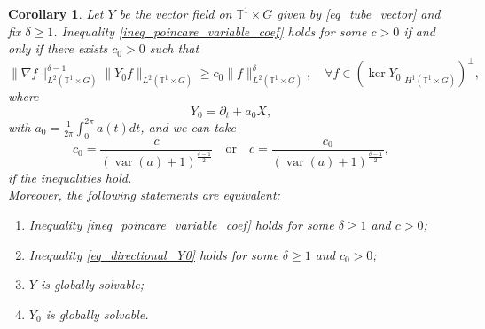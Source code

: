\documentclass[11pt]{amsart}
\numberwithin{theorem}{section}
\numberwithin{equation}{section}
\newtheorem{corollary}[theorem]{Corollary}
\theoremstyle{definition}
\numberwithin{example}{section}
\theoremstyle{definition}
\theoremstyle{definition}
\newcommand{\T}{\mathbb{T}}
\begin{document}
\begin{corollary}\label{coro_tube_1}
    Let $Y$ be the vector field on $\T^1\times G$ given by \eqref{eq_tube_vector} and fix $\delta\geq 1$. Inequality \eqref{ineq_poincare_variable_coef} holds for some $c>0$ if and only if there exists $c_0>0$ such that 
    \begin{equation}\label{eq_directional_Y0}
        \|\nabla f\|_{L^2(\T^1\times G)}^{\delta-1}\| Y_0f\|_{L^2(\T^1\times G)}\geq c_0\|f\|_{L^2(\T^1\times G)}^\delta,\quad \forall f\in (\ker Y_0|_{H^1(\T^1\times G)})^\perp,
    \end{equation}
  where
    \begin{equation*}
        Y_0=\partial_t+a_0X,
    \end{equation*}
    with $a_0=\frac{1}{2\pi}\int_{0}^{2\pi}a(t)dt$,
     and we can take 
        \begin{equation*}
        c_0=\frac{c}{(\operatorname{var}(a)+1)^{\frac{\delta-1}{2}}}\quad\text{or}\quad c=\frac{c_0}{(\operatorname{var}(a)+1)^{\frac{\delta-1}{2}}},
    \end{equation*}
    if the inequalities hold.\\
    Moreover, the following statements are equivalent:
    \begin{enumerate}
        \item  Inequality \eqref{ineq_poincare_variable_coef} holds for some $\delta\geq 1$ and $c>0$;
        \item Inequality \eqref{eq_directional_Y0} holds for some $\delta\geq 1$ and $c_0>0$;
        \item $Y$ is globally solvable;
        \item $Y_0$ is globally solvable.
    \end{enumerate}
\end{corollary}
\end{document}
